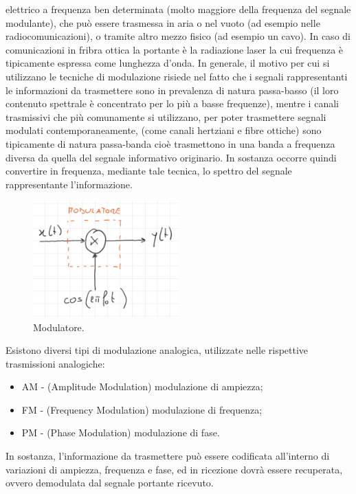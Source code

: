 \documentclass[12pt,oneside,openany]{memoir}
\numberwithin{equation}{subsection}
\begin{document}
elettrico a frequenza ben determinata (molto maggiore della frequenza del
segnale modulante), che pu\`o essere trasmessa in aria o nel vuoto (ad esempio
nelle radiocomunicazioni), o tramite altro mezzo fisico (ad esempio un cavo).
In caso di comunicazioni in fribra ottica la portante \`e la radiazione laser la
cui frequenza \`e tipicamente espressa come lunghezza d'onda.
\bigbreak
In generale, il motivo per cui si utilizzano le tecniche di modulazione risiede
nel fatto che i segnali rappresentanti le informazioni da trasmettere sono in
prevalenza di natura passa-basso (il loro contenuto spettrale \`e concentrato
per lo pi\`u a basse frequenze), mentre i canali trasmissivi che pi\`u
comunamente si utilizzano, per poter trasmettere segnali modulati
contemporaneamente, (come canali hertziani e fibre ottiche) sono tipicamente di
natura passa-banda cio\`e trasmettono in una banda a frequenza diversa da quella
del segnale informativo originario. In sostanza occorre quindi convertire in
frequenza, mediante tale tecnica, lo spettro del segnale rappresentante
l'informazione.
\begin{figure}[H]
	\centering
	\captionsetup{justification=centering}
	\includegraphics[width=0.5\textwidth]{images/modulatore.png}
	\caption{Modulatore.}
\end{figure}
Esistono diversi tipi di modulazione analogica, utilizzate nelle rispettive
trasmissioni analogiche:
\begin{itemize}
	\item AM - (Amplitude Modulation) modulazione di ampiezza;
	\item FM - (Frequency Modulation) modulazione di frequenza;
	\item PM - (Phase Modulation) modulazione di fase.
\end{itemize}
In sostanza, l'informazione da trasmettere pu\`o essere codificata all'interno
di variazioni di ampiezza, frequenza e fase, ed in ricezione dovr\`a essere
recuperata, ovvero demodulata dal segnale portante ricevuto.
\end{document}

